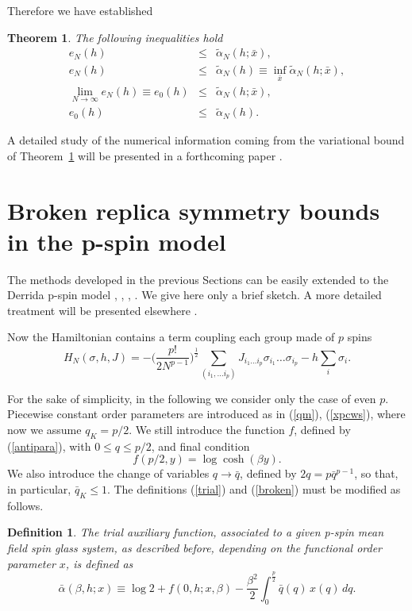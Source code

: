 \documentclass[a4paper,12pt]{article}
\newtheorem{theorem}{Theorem}
\newtheorem{definition}{Definition}
\begin{document}
Therefore we have established
\begin{theorem}
\label{tbound1}
The following inequalities hold
\begin{eqnarray}
\label{e1}
e_N(h)&\le& \tilde\alpha_N(h;{\bar x}),\\
\label{e2}
e_N(h)&\le& \tilde\alpha_N(h)\equiv \inf_{\bar x}\tilde\alpha_N(h;{\bar x}),\\
\label{e3}
\lim_{N\to\infty}e_N(h)\equiv e_0(h)&\le& \tilde\alpha_N(h;{\bar x}),\\
\label{e4}
e_0(h)&\le& \tilde\alpha_N(h).
\end{eqnarray}
\end{theorem}

A detailed study of the numerical information coming from the variational 
bound of Theorem~\ref{tbound1} will be presented in a forthcoming paper 
\cite{GTe}.  
  
\section{Broken replica symmetry bounds in the p-spin model}

The methods developed in the previous Sections can be easily extended to 
the Derrida p-spin model \cite{D}, \cite{GM}, \cite{Ga}, \cite{Tbook}.  
We give here only a brief sketch. A more 
detailed treatment will be presented elsewhere \cite{GTpspin}.

Now the Hamiltonian contains a term coupling each group made of $p$ spins
\begin{equation}\label{Hp}
H_N(\sigma,h,J)=-\bigl(\frac{p!}{2 N^{p-1}}\bigr)^{\frac12}
\sum_{(i_1,\dots i_p)}J_{i_1\dots i_p}\sigma_{i_1}\dots\sigma_{i_p}
-h\sum_{i}\sigma_i.
\end{equation}

For the sake of simplicity, in the following we consider only the case of 
even $p$. Piecewise constant order parameters are introduced as in 
(\ref{qm}), (\ref{xpcws}), where now we assume $q_K=p/2$. We still introduce 
the function $f$, defined by (\ref{antipara}), with $0\le q\le p/2$, and 
final condition
\begin{equation}
\label{finalp}
f(p/2,y)=\log\cosh(\beta y).
\end{equation}
We also introduce the change of variables $q\to {\bar q}$, 
defined by $2 q = p{\bar q}^{p-1}$, so that, in particular, ${\bar 
q}_K\le1$.  The definitions (\ref{trial}) and
(\ref{broken}) must be modified as follows. 
\begin{definition}
The trial auxiliary function, associated to a given p-spin mean field spin glass 
system, as described before, depending on the functional order 
parameter $x$, is defined as
\begin{equation}\label{trialp}
\bar\alpha(\beta,h;x)\equiv \log 2 + 
f(0,h;x,\beta)-\frac{\beta^2}{2}  \int_{0}^{\frac{p}{2}} 
{\bar q}(q)\, x(q)\,dq.
\end{equation}
\end{definition}
\end{document}
